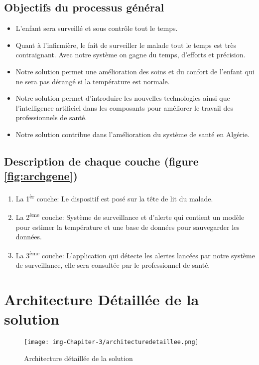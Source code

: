 \documentclass[12pt]{article}
\begin{document}
\subsection{Objectifs du processus général}
\begin{itemize}
	\item L’enfant sera surveillé et sous contrôle tout le temps.
	\item Quant à l'infirmière, le fait de surveiller le malade tout le temps est très contraignant. Avec notre système on gagne du temps, d'efforts et précision.	
	\item Notre solution permet une amélioration des soins et du confort de l'enfant qui ne sera pas dérangé si la température est normale.
		\item Notre solution permet d'introduire les nouvelles technologies ainsi que l'intelligence artificiel dans les composants pour améliorer le travail des professionnels de santé.
	\item Notre solution contribue dans l'amélioration du système de santé en Algérie.
\end{itemize}

\subsection{Description de chaque couche (figure \ref{fig:archgene})}
\begin{enumerate}
		\item La 1\textsuperscript{èr} couche: Le dispositif est posé sur la tête de lit du malade. 
		\item La 2\textsuperscript{ème} couche: Système de surveillance et d'alerte qui contient  un modèle pour estimer la température et une base de données pour sauvegarder les données.
		\item La 3\textsuperscript{ème} couche: L'application qui détecte les alertes lancées par notre système de surveillance, elle sera consultée par le professionnel de santé.
\end{enumerate}

\section{Architecture Détaillée de la solution}

\newpage
\begin{figure}[h]
	\centering
	\texttt{[image: img-Chapiter-3/architecturedetaillee.png]}
	\caption{Architecture détaillée de la solution}
\end{figure}
\end{document}
